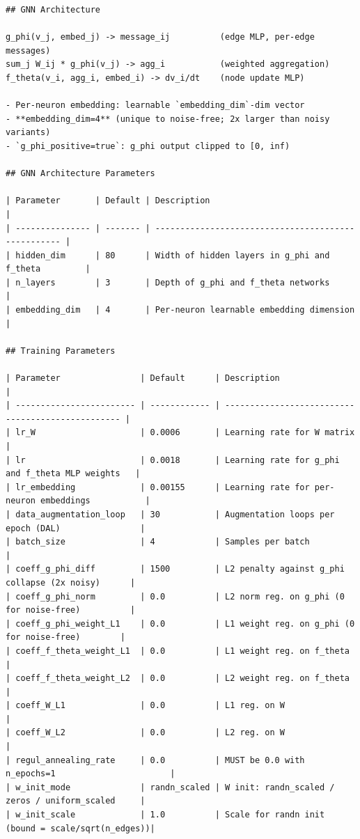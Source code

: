 \documentclass{article}
\begin{document}
\begin{tiny}
\begin{verbatim}
## GNN Architecture

g_phi(v_j, embed_j) -> message_ij          (edge MLP, per-edge messages)
sum_j W_ij * g_phi(v_j) -> agg_i           (weighted aggregation)
f_theta(v_i, agg_i, embed_i) -> dv_i/dt    (node update MLP)

- Per-neuron embedding: learnable `embedding_dim`-dim vector
- **embedding_dim=4** (unique to noise-free; 2x larger than noisy variants)
- `g_phi_positive=true`: g_phi output clipped to [0, inf)

## GNN Architecture Parameters

| Parameter       | Default | Description                                         |
| --------------- | ------- | --------------------------------------------------- |
| hidden_dim      | 80      | Width of hidden layers in g_phi and f_theta         |
| n_layers        | 3       | Depth of g_phi and f_theta networks                 |
| embedding_dim   | 4       | Per-neuron learnable embedding dimension            |

## Training Parameters

| Parameter                | Default      | Description                                       |
| ------------------------ | ------------ | ------------------------------------------------- |
| lr_W                     | 0.0006       | Learning rate for W matrix                        |
| lr                       | 0.0018       | Learning rate for g_phi and f_theta MLP weights   |
| lr_embedding             | 0.00155      | Learning rate for per-neuron embeddings           |
| data_augmentation_loop   | 30           | Augmentation loops per epoch (DAL)                |
| batch_size               | 4            | Samples per batch                                 |
| coeff_g_phi_diff         | 1500         | L2 penalty against g_phi collapse (2x noisy)      |
| coeff_g_phi_norm         | 0.0          | L2 norm reg. on g_phi (0 for noise-free)          |
| coeff_g_phi_weight_L1    | 0.0          | L1 weight reg. on g_phi (0 for noise-free)        |
| coeff_f_theta_weight_L1  | 0.0          | L1 weight reg. on f_theta                         |
| coeff_f_theta_weight_L2  | 0.0          | L2 weight reg. on f_theta                         |
| coeff_W_L1               | 0.0          | L1 reg. on W                                      |
| coeff_W_L2               | 0.0          | L2 reg. on W                                      |
| regul_annealing_rate     | 0.0          | MUST be 0.0 with n_epochs=1                       |
| w_init_mode              | randn_scaled | W init: randn_scaled / zeros / uniform_scaled     |
| w_init_scale             | 1.0          | Scale for randn init (bound = scale/sqrt(n_edges))|


\end{verbatim}
\end{tiny}
\end{document}
